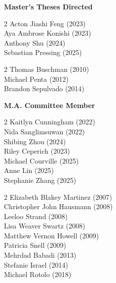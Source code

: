 
\noindent \textbf{Master's Theses Directed}

    \begin{multicols}{2}
    \noindent
    Acton Jiashi Feng (2023) \\
    Aya Ambrose Konishi (2023)  \\ 	
    Anthony Shu (2024) \\
    Sebastian Pressing (2025)
\end{multicols}
\medskip

    \begin{multicols}{2}
    \noindent
    Thomas Buschman (2010) \\
    Michael Penta (2012) \\
    Brandon Sepulvado (2014) 
\end{multicols}
\medskip

\noindent \textbf{M.A. Committee Member} 

\begin{multicols}{2}
    \noindent
    Kaitlyn Cunningham (2022) \\
    Nida Sanglimsuwan (2022) \\
    Shibing Zhou (2024) \\
    Riley Ceperich (2023) \\
    Michael Courville (2025) \\
    Anne Lin (2025)  \\
    Stephanie Zhang (2025) 
\end{multicols}
\medskip

\begin{multicols}{2}
    \noindent
    Elizabeth Blakey Martinez (2007) \\
    Christopher John Hausmann (2008) \\
    Leeloo Strand (2008) \\
    Lisa Weaver Swartz (2008) \\
    Matthew Vernon Howell (2009) \\
    Patricia Snell (2009) \\
    Mehrdad Babadi (2013) \\
    Stefanie Israel (2014) \\
    Michael Rotolo (2018)
\end{multicols}
\medskip
